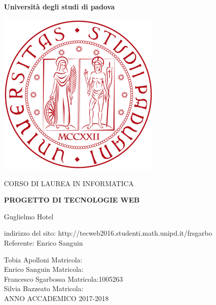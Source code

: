 \begin{titlepage}%

	\begin{center}
	\begin{huge}
		\textbf{Università degli studi di padova}
	\end{huge}
	\vspace{2cm}
	\begin{center}
		\includegraphics[width=8cm]{../templates/_Immagini/logo.png}
	\end{center}
	\vspace{1cm}
	
	\begin{LARGE}CORSO DI LAUREA IN INFORMATICA \end{LARGE}

	\vspace{1cm}
	
	\begin{huge}
		\textbf{PROGETTO DI TECNOLOGIE WEB}
	\end{huge}

	\vspace{2cm}

	\begin{LARGE}Guglielmo Hotel \end{LARGE}

	\vspace{2cm}

	indirizzo del sito: http://tecweb2016.studenti.math.unipd.it/frsgarbo\\
	Referente: Enrico Sanguin
	\vspace{1cm}

	Tobia Apolloni Matricola:	\\
	Enrico Sanguin Matricola:	\\
	Francesco Sgarbossa Matricola:1005263	\\
	Silvia Bazzeato Matricola:	\\
	\vspace{1cm}
	ANNO ACCADEMICO 2017-2018
	\end{center}
\end{titlepage}%

\clearpage
